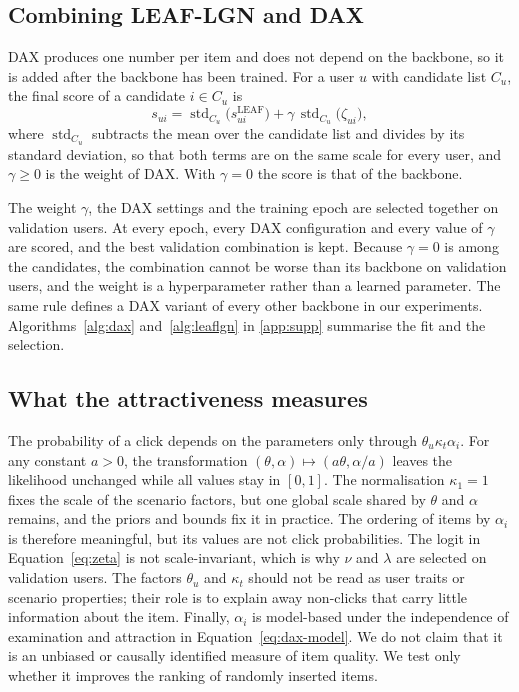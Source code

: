 \subsection{Combining LEAF-LGN and DAX}
\label{sec:method-combine}

DAX produces one number per item and does not depend on the backbone, so it is added after the backbone has been trained. For a user
$u$ with candidate list $C_u$, the final score of a candidate $i\in C_u$ is
\begin{equation}
  s_{ui}=\operatorname{std}_{C_u}\bigl(s^{\mathrm{LEAF}}_{ui}\bigr)+\gamma\,\operatorname{std}_{C_u}\bigl(\zeta_{ui}\bigr),
  \label{eq:combine}
\end{equation}
where $\operatorname{std}_{C_u}$ subtracts the mean over the candidate list and divides by its standard deviation, so that both terms are on
the same scale for every user, and $\gamma\ge0$ is the weight of DAX. With $\gamma=0$ the score is that of the backbone.

The weight $\gamma$, the DAX settings and the training epoch are selected together on validation users. At every epoch, every DAX configuration
and every value of $\gamma$ are scored, and the best validation combination is kept. Because $\gamma=0$ is among the candidates, the combination
cannot be worse than its backbone on validation users, and the weight is a hyperparameter rather than a learned parameter. The same rule defines a
DAX variant of every other backbone in our experiments. Algorithms~\ref{alg:dax} and~\ref{alg:leaflgn} in \ref{app:supp} summarise the fit and the selection.

\subsection{What the attractiveness measures}
\label{sec:method-identify}

The probability of a click depends on the parameters only through $\theta_u\kappa_t\alpha_i$. For any constant $a>0$, the transformation
$(\theta,\alpha)\mapsto(a\theta,\alpha/a)$ leaves the likelihood unchanged while all values stay in $[0,1]$. The normalisation $\kappa_1=1$ fixes
the scale of the scenario factors, but one global scale shared by $\theta$ and $\alpha$ remains, and the priors and bounds fix it in practice.
The ordering of items by $\alpha_i$ is therefore meaningful, but its values are not click probabilities. The logit in Equation~\eqref{eq:zeta} is
not scale-invariant, which is why $\nu$ and $\lambda$ are selected on validation users. The factors $\theta_u$ and $\kappa_t$ should not be read as
user traits or scenario properties; their role is to explain away non-clicks that carry little information about the item. Finally, $\alpha_i$ is
model-based under the independence of examination and attraction in Equation~\eqref{eq:dax-model}. We do not claim that it is an unbiased or
causally identified measure of item quality. We test only whether it improves the ranking of randomly inserted items.
